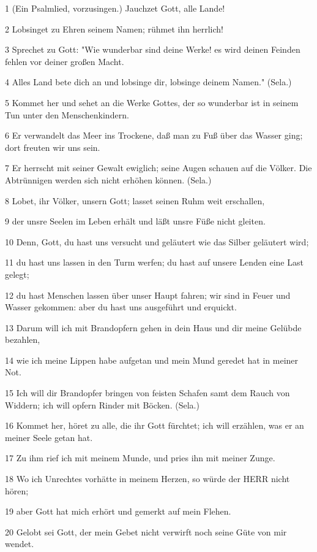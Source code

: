 \par 1 (Ein Psalmlied, vorzusingen.) Jauchzet Gott, alle Lande!
\par 2 Lobsinget zu Ehren seinem Namen; rühmet ihn herrlich!
\par 3 Sprechet zu Gott: "Wie wunderbar sind deine Werke! es wird deinen Feinden fehlen vor deiner großen Macht.
\par 4 Alles Land bete dich an und lobsinge dir, lobsinge deinem Namen." (Sela.)
\par 5 Kommet her und sehet an die Werke Gottes, der so wunderbar ist in seinem Tun unter den Menschenkindern.
\par 6 Er verwandelt das Meer ins Trockene, daß man zu Fuß über das Wasser ging; dort freuten wir uns sein.
\par 7 Er herrscht mit seiner Gewalt ewiglich; seine Augen schauen auf die Völker. Die Abtrünnigen werden sich nicht erhöhen können. (Sela.)
\par 8 Lobet, ihr Völker, unsern Gott; lasset seinen Ruhm weit erschallen,
\par 9 der unsre Seelen im Leben erhält und läßt unsre Füße nicht gleiten.
\par 10 Denn, Gott, du hast uns versucht und geläutert wie das Silber geläutert wird;
\par 11 du hast uns lassen in den Turm werfen; du hast auf unsere Lenden eine Last gelegt;
\par 12 du hast Menschen lassen über unser Haupt fahren; wir sind in Feuer und Wasser gekommen: aber du hast uns ausgeführt und erquickt.
\par 13 Darum will ich mit Brandopfern gehen in dein Haus und dir meine Gelübde bezahlen,
\par 14 wie ich meine Lippen habe aufgetan und mein Mund geredet hat in meiner Not.
\par 15 Ich will dir Brandopfer bringen von feisten Schafen samt dem Rauch von Widdern; ich will opfern Rinder mit Böcken. (Sela.)
\par 16 Kommet her, höret zu alle, die ihr Gott fürchtet; ich will erzählen, was er an meiner Seele getan hat.
\par 17 Zu ihm rief ich mit meinem Munde, und pries ihn mit meiner Zunge.
\par 18 Wo ich Unrechtes vorhätte in meinem Herzen, so würde der HERR nicht hören;
\par 19 aber Gott hat mich erhört und gemerkt auf mein Flehen.
\par 20 Gelobt sei Gott, der mein Gebet nicht verwirft noch seine Güte von mir wendet.

